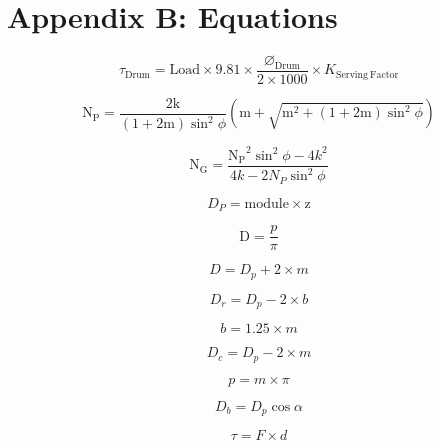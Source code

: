 \appendix
\section{Appendix B: Equations}
\label{app:B_equations}

\begin{equation}
\label{eq:drum_torque}
\tau_{\mathrm{Drum}} = \mathrm{Load} \times 9.81 \times \frac{\varnothing_{\mathrm{Drum}}}{2 \times 1000} \times K_{\mathrm{Serving\ Factor}}
\end{equation}

\begin{equation}
\label{eq:min_gear}
\mathrm{N_P} = \frac{2\mathrm{k}}{(1 + 2\mathrm{m})\sin^2 \phi} \left( \mathrm{m} + \sqrt{\mathrm{m}^2 + (1 + 2\mathrm{m})\sin^2 \phi} \right)\end{equation}

\begin{equation}
\label{eq:max_gear}
\mathrm{N_G} = \frac{\mathrm{N_P}^2 \sin^2 \phi - 4k^2}{4k - 2N_P \sin^2 \phi}
\end{equation}

\begin{equation}
\label{eq:pitch_circle}
D_P = \mathrm{module} \times \mathrm{z}
\end{equation}

\begin{equation}
\label{eq:gear_module}
\mathrm{D} = \frac{p}{\pi}
\end{equation}


\begin{equation}
\label{eq:addendum_circle}
D = D_p + 2 \times m
\end{equation}


\begin{equation}
\label{eq:root_circle}
D_r = D_p - 2 \times b
\end{equation}


\begin{equation}
\label{eq:dedendum}
b = 1.25 \times m
\end{equation}

\begin{equation}
\label{eq:clearance_circle}
D_c = D_p - 2\times m
\end{equation}


\begin{equation}
\label{eq:circular_pitch}
p = m\times\pi
\end{equation}

\begin{equation}
\label{eq:base_circle}
D_b = D_p \cos{\alpha}
\end{equation}

\begin{equation}
    \label{eq:rig_torque}
    \tau = F \times d
\end{equation}